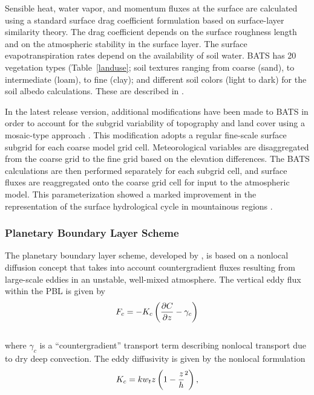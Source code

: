 Sensible heat, water vapor, and momentum fluxes at the surface are 
calculated using a standard surface drag coefficient formulation 
based on surface-layer similarity theory.  The drag coefficient depends
on the surface roughness length and on the atmospheric stability 
in the surface layer.  The surface evapotranspiration rates depend 
on the availability of soil water.  \ac{BATS} has 20 vegetation types (Table~\ref{landuse};  soil
textures ranging from coarse (sand), to intermediate (loam), to fine
 (clay);  and different soil colors (light to dark) for the soil 
albedo calculations.  These are described in \cite{Dickinson_86}. 

In the latest release version, additional modifications have been made to \ac{BATS}
in order to account for the subgrid variability of topography and land
cover using a mosaic-type approach \citep{Giorgi03b}.  This
modification adopts a regular fine-scale surface subgrid for each
coarse model grid cell.  Meteorological variables are disaggregated
from the coarse grid to the fine grid based on the elevation
differences.  The \ac{BATS} calculations are then performed separately
for each subgrid cell, and surface fluxes are reaggregated onto the
coarse grid cell for input to the atmospheric model. This
parameterization showed a marked improvement in the representation of
the surface hydrological cycle in mountainous regions \citep{Giorgi03b}.  

\subsubsection{Planetary Boundary Layer Scheme}
\noindent
The planetary boundary layer
scheme, developed by \cite{Holtslag_90}, is based on a nonlocal
diffusion concept that takes into account countergradient fluxes 
resulting from large-scale eddies in an unstable, well-mixed atmosphere.
The vertical eddy flux within the PBL is given by \\
\begin{eqnarray}
F_c = -K_c \left( {\partial{C} \over \partial{z}} - \gamma_c \right)
\end{eqnarray} \\

\noindent
where $\gamma_c$ is a ``countergradient'' transport term describing 
nonlocal transport due to dry deep convection.  The eddy diffusivity 
is given by the nonlocal formulation \\
\begin{eqnarray}
K_c = kw_tz \left( 1- {z \over h}^2 \right),
\end{eqnarray}

